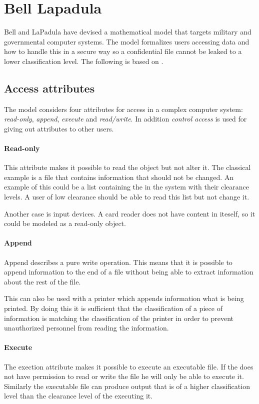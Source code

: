 \section{Bell Lapadula}

Bell and LaPadula have devised a mathematical model that targets military and governmental computer systems.
The model formalizes users accessing data and how to handle this in a secure way so a confidential file cannot be leaked to a lower classification level.
The following is based on \citet{lapadula1996secure}.

\subsection{Access attributes}
The model considers four attributes for access in a complex computer system: \emph{read-only}, \emph{append}, \emph{execute} and \emph{read/write}.
In addition \emph{control access} is used for giving out attributes to other users.

\paragraph{Read-only}
This attribute makes it possible to read the object but not alter it.
The classical example is a file that contains information that should not be changed.
An example of this could be a list containing the \principals{} in the system with their clearance levels.
A user of low clearance should be able to read this list but not change it.

Another case is input devices.
A card reader does not have content in iteself, so it could be modeled as a read-only object.

\paragraph{Append}
Append describes a pure write operation.
This means that it is possible to append information to the end of a file without being able to extract information about the rest of the file.

This can also be used with a printer which appends information what is being printed.
By doing this it is sufficient that the classification of a piece of information is matching the classification of the printer in order to prevent unauthorized personnel from reading the information.

\paragraph{Execute}
The exection attribute makes it possible to execute an executable file.
If the \principal{} does not have permission to read or write the file he will only be able to execute it.
Similarly the executable file can produce output that is of a higher classification level than the clearance level of the \principal{} executing it.

